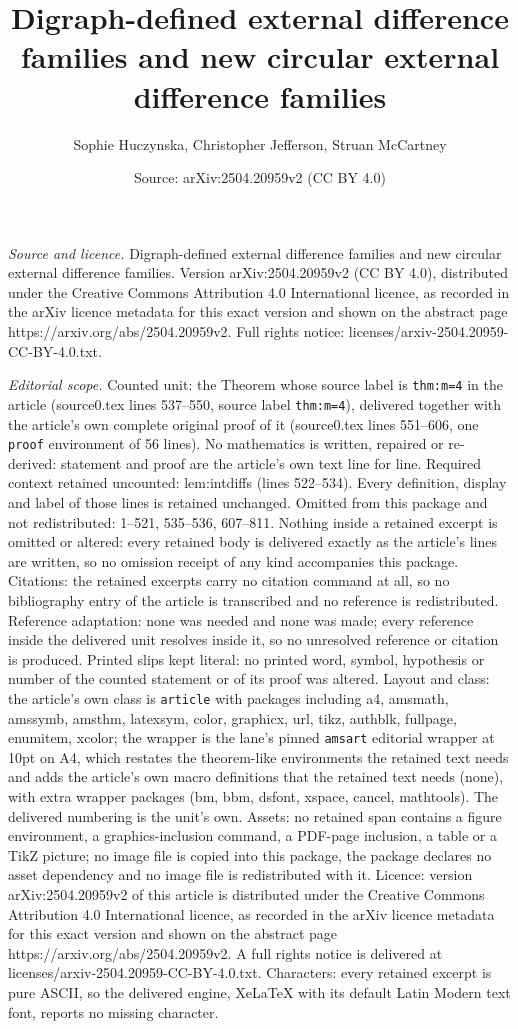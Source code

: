 \documentclass[10pt,a4paper]{amsart}
\title[Digraph-defined external difference families and new circula]{Digraph-defined external difference families and new circular external difference families}
\author{Sophie Huczynska, Christopher Jefferson, Struan McCartney}
\date{Source: arXiv:2504.20959v2 (CC BY 4.0)}
\begin{document}
\maketitle

\noindent\emph{Source and licence.} Digraph-defined external difference families and new circular external difference families. Version arXiv:2504.20959v2 (CC BY 4.0), distributed under the Creative Commons Attribution 4.0 International licence, as recorded in the arXiv licence metadata for this exact version and shown on the abstract page https://arxiv.org/abs/2504.20959v2. Full rights notice: licenses/arxiv-2504.20959-CC-BY-4.0.txt.\par\smallskip

\noindent\textit{Editorial scope.} Counted unit: the Theorem whose source label is \texttt{thm:m=4} in the article (source0.tex lines 537--550, source label \texttt{thm:m=4}), delivered together with the article's own complete original proof of it (source0.tex lines 551--606, one \texttt{proof} environment of 56 lines). No mathematics is written, repaired or re-derived: statement and proof are the article's own text line for line. Required context retained uncounted: lem:intdiffs (lines 522--534). Every definition, display and label of those lines is retained unchanged. Omitted from this package and not redistributed: 1--521, 535--536, 607--811. Nothing inside a retained excerpt is omitted or altered: every retained body is delivered exactly as the article's lines are written, so no omission receipt of any kind accompanies this package. Citations: the retained excerpts carry no citation command at all, so no bibliography entry of the article is transcribed and no reference is redistributed. Reference adaptation: none was needed and none was made; every reference inside the delivered unit resolves inside it, so no unresolved reference or citation is produced. Printed slips kept literal: no printed word, symbol, hypothesis or number of the counted statement or of its proof was altered. Layout and class: the article's own class is \texttt{article} with packages including a4, amsmath, amssymb, amsthm, latexsym, color, graphicx, url, tikz, authblk, fullpage, enumitem, xcolor; the wrapper is the lane's pinned \texttt{amsart} editorial wrapper at 10pt on A4, which restates the theorem-like environments the retained text needs and adds the article's own macro definitions that the retained text needs (none), with extra wrapper packages (bm, bbm, dsfont, xspace, cancel, mathtools). The delivered numbering is the unit's own. Assets: no retained span contains a figure environment, a graphics-inclusion command, a PDF-page inclusion, a table or a TikZ picture; no image file is copied into this package, the package declares no asset dependency and no image file is redistributed with it. Licence: version arXiv:2504.20959v2 of this article is distributed under the Creative Commons Attribution 4.0 International licence, as recorded in the arXiv licence metadata for this exact version and shown on the abstract page https://arxiv.org/abs/2504.20959v2. A full rights notice is delivered at licenses/arxiv-2504.20959-CC-BY-4.0.txt. Characters: every retained excerpt is pure ASCII, so the delivered engine, XeLaTeX with its default Latin Modern text font, reports no missing character.
\end{document}
